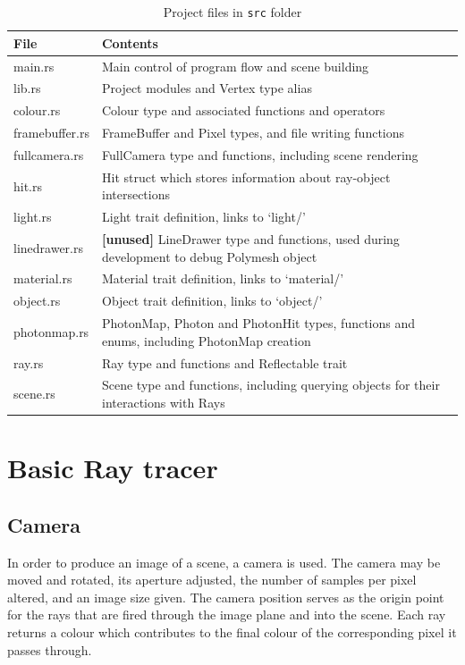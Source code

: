 \documentclass[a4paper]{article}
\begin{document}
\begin{table}[h]
    \centering
    \caption{Project files in \texttt{src} folder}
    \label{tab:projfiles}
        \begin{tabular}{@{}l|l@{}}
            \toprule
            File & Contents \\ \midrule
            main.rs & Main control of program flow and scene building \\
            lib.rs & Project modules and Vertex type alias \\
            colour.rs & Colour type and associated functions and operators \\
            framebuffer.rs & FrameBuffer and Pixel types, and file writing functions \\ 
            fullcamera.rs & FullCamera type and functions, including scene rendering \\
            hit.rs & Hit struct which stores information about ray-object intersections \\
            light.rs & Light trait definition, links to `light/' \\
            linedrawer.rs & \textbf{[unused]} LineDrawer type and functions, used during development to debug Polymesh object \\
            material.rs & Material trait definition, links to `material/' \\
            object.rs &  Object trait definition, links to `object/' \\
            photonmap.rs & PhotonMap, Photon and PhotonHit types, functions and enums, including PhotonMap creation \\
            ray.rs & Ray type and functions and Reflectable trait \\
            scene.rs & Scene type and functions, including querying objects for their interactions with Rays \\
            \bottomrule
        \end{tabular}
\end{table}

\section{Basic Ray tracer}
\subsection{Camera}
In order to produce an image of a scene, a camera is used. The camera may be moved and rotated, its aperture adjusted, the number of samples per pixel altered, and an image size given. The camera position serves as the origin point for the rays that are fired through the image plane and into the scene. Each ray returns a colour which contributes to the final colour of the corresponding pixel it passes through.\\
\end{document}
